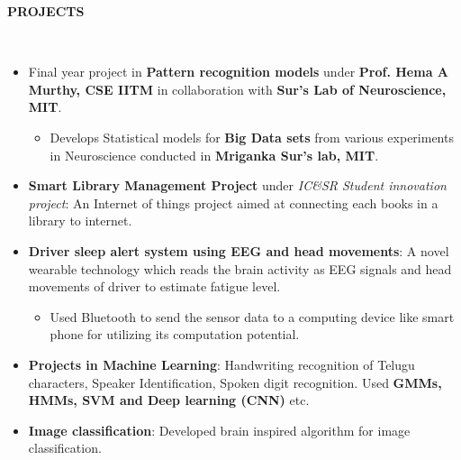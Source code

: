 \documentclass[a4paper,10pt]{article}
\newcommand{\lsep}{-0.5cm}
\newcommand{\resheading}[1]{{\small \colorbox{mygrey}{\begin{minipage}{0.975\textwidth}{\textbf{#1 \vphantom{p\^{E}}}}\end{minipage}}}}
\begin{document}
\resheading{\textbf{PROJECTS} }\\[\lsep]
    \begin{itemize}
        \item Final year project in \textbf{Pattern recognition models} under \textbf{Prof. Hema A Murthy, CSE IITM} in collaboration with \textbf{Sur's Lab of Neuroscience, MIT}.
        \begin{itemize}
            \vspace{-5pt}
            \item Develops Statistical models for \textbf{Big Data sets} from various experiments in Neuroscience conducted in \textbf{Mriganka Sur's lab, MIT}.\vspace{-5pt}
        \end{itemize}
        \item \textbf{Smart Library Management Project} under \textit{IC\&SR Student innovation project}: An Internet of things project aimed at connecting each books in a library to internet.\vspace{-5pt}
        \item \textbf{Driver sleep alert system using EEG and head movements}: A novel wearable technology which reads the brain activity as EEG signals and head movements of driver to estimate fatigue level.
        \vspace{-5pt}
        \begin{itemize}
            \item Used Bluetooth to send the sensor data to a computing device like smart phone for utilizing its computation potential.\vspace{-5pt}
        \end{itemize}                    
        \item \textbf{Projects in Machine Learning}: Handwriting recognition of Telugu characters, Speaker Identification, Spoken digit recognition. Used \textbf{GMMs, HMMs, SVM and Deep learning (CNN)} etc. \vspace{-5pt}
        \item \textbf{Image classification}: Developed brain inspired algorithm for image classification.
    \end{itemize}
\end{document}
